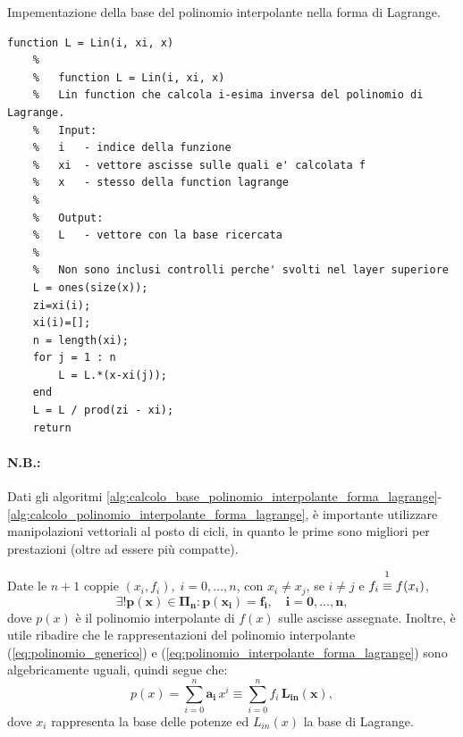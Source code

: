 \begin{algorithm}
\caption{Impementazione della base del polinomio interpolante nella forma di Lagrange.}\label{alg:calcolo_base_polinomio_interpolante_forma_lagrange}
    \begin{lstlisting}[style=Matlab-editor]
    function L = Lin(i, xi, x)
    %
    %   function L = Lin(i, xi, x)
    %   Lin function che calcola i-esima inversa del polinomio di Lagrange.
    %   Input:
    %   i   - indice della funzione
    %   xi  - vettore ascisse sulle quali e' calcolata f
    %   x   - stesso della function lagrange
    %
    %   Output:
    %   L   - vettore con la base ricercata
    %
    %   Non sono inclusi controlli perche' svolti nel layer superiore
    L = ones(size(x));
    zi=xi(i);
    xi(i)=[];
    n = length(xi);
    for j = 1 : n
        L = L.*(x-xi(j));
    end
    L = L / prod(zi - xi);
    return
    \end{lstlisting}
\end{algorithm}

\paragraph{N.B.:} Dati gli algoritmi \ref{alg:calcolo_base_polinomio_interpolante_forma_lagrange}-\ref{alg:calcolo_polinomio_interpolante_forma_lagrange}, è importante utilizzare manipolazioni vettoriali al posto di cicli, in quanto le prime sono migliori per prestazioni (oltre ad essere più compatte).

\begin{remark}
	Date le $n+1$ coppie $(x_i,f_i),\; i=0,\hdots,n$, con $x_i\neq x_j$, se $i\neq j$ e $f_i\overset{\footnotemark}{\equiv} f(x_i)$,
	\begin{equation*}
	    \boldsymbol{\exists!p(x)\in\Pi_n:p(x_i)=f_i,\quad i=0,\hdots, n},
	\end{equation*}
	dove $p(x)$ è il polinomio interpolante di $f(x)$ sulle ascisse assegnate. Inoltre, è utile ribadire che le rappresentazioni del polinomio interpolante (\ref{eq:polinomio_generico}) e (\ref{eq:polinomio_interpolante_forma_lagrange}) sono algebricamente uguali, quindi segue che: 
	\begin{equation}\label{eq:equivalenza_basi}
		p(x)=\sum_{i=0}^n \boldsymbol{a_i}\, x^i \equiv \sum_{i=0}^n f_i\, \boldsymbol{L_{in}(x)},
	\end{equation}
	dove $x_i$ rappresenta la base delle potenze ed $L_{in}(x)$ la base di Lagrange.
\end{remark}

